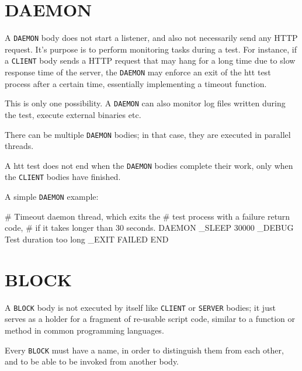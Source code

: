 
\newpage
\section{DAEMON}
\label{chap:daemon}

A \texttt{DAEMON} body does not start a listener, and also not necessarily 
send any HTTP request. It's purpose is to perform monitoring tasks during 
a test. For instance, if a \texttt{CLIENT} body sends a HTTP request that 
may hang for a long time due to slow response time of the server, the 
\texttt{DAEMON} may enforce an exit of the htt test process after a certain 
time, essentially implementing a timeout function.

This is only one possibility. A \texttt{DAEMON} can also monitor log files 
written during the test, execute external binaries etc.

There can be multiple \texttt{DAEMON} bodies; in that case, 
they are executed in parallel threads.

A htt test does not end when the \texttt{DAEMON} bodies complete their work, 
only when the \texttt{CLIENT} bodies have finished.

A simple \texttt{DAEMON} example:

\begin{usplisting}
    # Timeout daemon thread, which exits the 
    # test process with a failure return code,
    # if it takes longer than 30 seconds.
    DAEMON
    _SLEEP 30000
    _DEBUG Test duration too long
    _EXIT FAILED
    END
\end{usplisting}



\newpage
\section{BLOCK}
\label{chap:block}

A \texttt{BLOCK} body is not executed by itself like \texttt{CLIENT} or 
\texttt{SERVER} bodies; it just serves as a holder for a fragment of 
re-usable script code, similar to a function or method in common 
programming languages.

Every \texttt{BLOCK} must have a name, in order to distinguish them from 
each other, and to be able to be invoked from another body.

